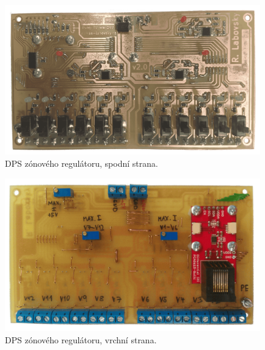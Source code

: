 \begin{figure}[H]
    \centering
    \includegraphics[width=0.99\textwidth]{images/zonovy-regulator/dps-zonovy-regulator-spodni-strana.png}
    \caption{DPS zónového regulátoru, spodní strana.}
    \label{fig:dps-zonovy-regulator-spodni-strana}
\end{figure}

\begin{figure}[H]
    \centering
    \includegraphics[width=0.99\textwidth]{images/zonovy-regulator/dps-zonovy-regulator-vrchni-strana.png}
    \caption{DPS zónového regulátoru, vrchní strana.}
    \label{fig:dps-zonovy-regulator-vrchni-strana}
\end{figure}



